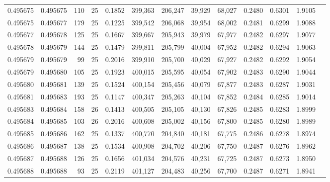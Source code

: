 \begin{tabular}{rrrrrrrrrrrrr}
0.495675 & 0.495675 &   110 &  25 &                                     0.1852 & 399,363 & 206,247 &  39,929 &  68,027 & 0.2480 & 0.6301 & 1.9105 \\
0.495675 & 0.495677 &   179 &  25 &                                     0.1225 & 399,542 & 206,068 &  39,954 &  68,002 & 0.2481 & 0.6299 & 1.9088 \\
0.495677 & 0.495678 &   125 &  25 &                                     0.1667 & 399,667 & 205,943 &  39,979 &  67,977 & 0.2482 & 0.6297 & 1.9077 \\
0.495678 & 0.495679 &   144 &  25 &                                     0.1479 & 399,811 & 205,799 &  40,004 &  67,952 & 0.2482 & 0.6294 & 1.9063 \\
0.495679 & 0.495679 &    99 &  25 &                                     0.2016 & 399,910 & 205,700 &  40,029 &  67,927 & 0.2482 & 0.6292 & 1.9054 \\
0.495679 & 0.495680 &   105 &  25 &                                     0.1923 & 400,015 & 205,595 &  40,054 &  67,902 & 0.2483 & 0.6290 & 1.9044 \\
0.495680 & 0.495681 &   139 &  25 &                                     0.1524 & 400,154 & 205,456 &  40,079 &  67,877 & 0.2483 & 0.6287 & 1.9031 \\
0.495681 & 0.495683 &   193 &  25 &                                     0.1147 & 400,347 & 205,263 &  40,104 &  67,852 & 0.2484 & 0.6285 & 1.9014 \\
0.495683 & 0.495684 &   158 &  26 &                                     0.1413 & 400,505 & 205,105 &  40,130 &  67,826 & 0.2485 & 0.6283 & 1.8999 \\
0.495684 & 0.495685 &   103 &  26 &                                     0.2016 & 400,608 & 205,002 &  40,156 &  67,800 & 0.2485 & 0.6280 & 1.8989 \\
0.495685 & 0.495686 &   162 &  25 &                                     0.1337 & 400,770 & 204,840 &  40,181 &  67,775 & 0.2486 & 0.6278 & 1.8974 \\
0.495686 & 0.495687 &   138 &  25 &                                     0.1534 & 400,908 & 204,702 &  40,206 &  67,750 & 0.2487 & 0.6276 & 1.8962 \\
0.495687 & 0.495688 &   126 &  25 &                                     0.1656 & 401,034 & 204,576 &  40,231 &  67,725 & 0.2487 & 0.6273 & 1.8950 \\
0.495688 & 0.495688 &    93 &  25 &                                     0.2119 & 401,127 & 204,483 &  40,256 &  67,700 & 0.2487 & 0.6271 & 1.8941 \\

\end{tabular}
